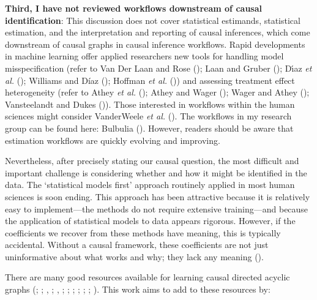 \documentclass[
  single column]{article}
\begin{document}
\textbf{Third, I have not reviewed workflows downstream of causal
identification}: This discussion does not cover statistical estimands,
statistical estimation, and the interpretation and reporting of causal
inferences, which come downstream of causal graphs in causal inference
workflows. Rapid developments in machine learning offer applied
researchers new tools for handling model misspecification (refer to Van
Der Laan and Rose (); Laan and Gruber
(); Dı́az \emph{et al.}
(); Williams and Díaz
(); Hoffman \emph{et al.}
()) and assessing treatment effect
heterogeneity (refer to Athey \emph{et al.}
(); Athey and Wager
(); Wager and Athey
(); Vansteelandt and Dukes
()). Those interested in workflows
within the human sciences might consider VanderWeele \emph{et al.}
(). The workflows in my research
group can be found here: Bulbulia
(). However, readers should
be aware that estimation workflows are quickly evolving and improving.

Nevertheless, after precisely stating our causal question, the most
difficult and important challenge is considering whether and how it
might be identified in the data. The `statistical models first' approach
routinely applied in most human sciences is soon ending. This approach
has been attractive because it is relatively easy to implement---the
methods do not require extensive training---and because the application
of statistical models to data appears rigorous. However, if the
coefficients we recover from these methods have meaning, this is
typically accidental. Without a causal framework, these coefficients are
not just uninformative about what works and why; they lack any meaning
().

There are many good resources available for learning causal directed
acyclic graphs (;
;
,
; , ;
;
;
;
; ; ). This work
aims to add to these resources by:
\end{document}
